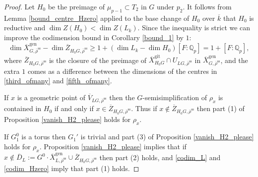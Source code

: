 \documentclass{amsart}
\theoremstyle{definition}
\theoremstyle{remark}
\newcommand{\Qp}{\mathbb {Q}_p}
\newcommand{\Zbar}{\overline{Z}}
\newcommand{\Vbar}{\overline{{V}}}
\newcommand{\rhobar}{\overline{\rho}}
\newcommand{\gen}{\mathrm{gen}}
\newcommand{\gps}{\mathrm{git}}
\newcommand{\Xbar}{\overline{X}}
\newcommand{\kbar}{\overline{k}}
\newcommand{\rhobarss}{\rhobar^{\mathrm{ss}}}
\begin{document}
\begin{proof}
Let  $H_0$ be the preimage of $\mu_{p-1} \subset T_2$ in $G$ under $p_2$. It follows from 
Lemma \ref{bound_centre_Hzero} applied to the base change of $H_0$ over $\kbar$ that $H_0$ is reductive and 
$\dim Z(H_0)< \dim Z(L_k)$. Since the inequality is strict we can improve the codimension bound
in Corollary \ref{bound_1} by $1$: 
\begin{equation}\label{codim_Hzero}
\dim \Xbar^{\gen}_{G, \rhobarss} - \dim \Zbar_{H_0 G, \rhobarss}\ge 1+ (\dim L_k - \dim H_0)[F:\Qp]= 1+[F:\Qp],
\end{equation}
where $\Zbar_{H_0 G, \rhobarss}$ is the closure of the preimage of $\Xbar^{\gps}_{H_0 G}\cap U_{LG, \rhobarss}$ in $\Xbar^{\gen}_{G, \rhobarss}$, and the extra $1$ comes as a difference between the dimensions of the centres in \eqref{third_ofmany} and 
\eqref{fifth_ofmany}.

If $x$ is a geometric point of $\Vbar_{LG, \rhobarss}$ then the $G$-semisimplification of 
$\rho_x$ is contained in $H_0$ if and only if $x\in \Zbar_{H_0 G, \rhobarss}$.
Thus if $x\not \in \Zbar_{H_0 G, \rhobarss}$ then part (1) of Proposition \ref{vanish_H2_please}
holds for $\rho_x$. 

If $G_1^0$ is a torus then $G_1'$ is trivial and part (3) of Proposition \ref{vanish_H2_please} 
holds for $\rho_x$. Proposition \ref{vanish_H2_please} implies that 
if $x\not\in  \overline{D}_L:= G^0\cdot \Xbar^{\gen}_{L, \rhobarss} \cup \Zbar_{H_0 G, \rhobarss}$
then part (2) holds, and \eqref{codim_L} and \eqref{codim_Hzero} imply that part (1) holds. 




\end{proof}
\end{document}
